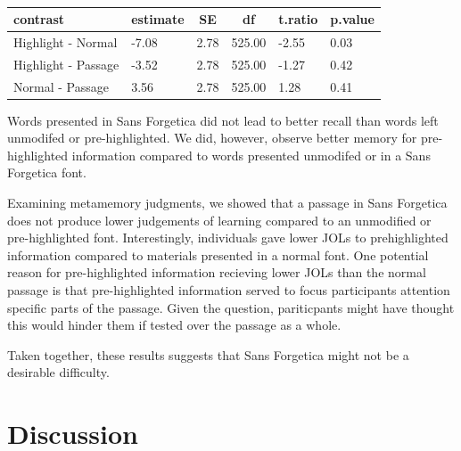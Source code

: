 \documentclass[english,doc]{apa6}
\begin{document}
\begin{table}[tbp]

\begin{center}
\begin{threeparttable}

\caption{\label{tab:unnamed-chunk-4}}

\begin{tabular}{llllll}
\toprule
contrast & \multicolumn{1}{c}{estimate} & \multicolumn{1}{c}{SE} & \multicolumn{1}{c}{df} & \multicolumn{1}{c}{t.ratio} & \multicolumn{1}{c}{p.value}\\
\midrule
Highlight - Normal & -7.08 & 2.78 & 525.00 & -2.55 & 0.03\\
Highlight - Passage & -3.52 & 2.78 & 525.00 & -1.27 & 0.42\\
Normal - Passage & 3.56 & 2.78 & 525.00 & 1.28 & 0.41\\
\bottomrule
\end{tabular}

\end{threeparttable}
\end{center}

\end{table}

Words presented in Sans Forgetica did not lead to better recall than words left unmodifed or pre-highlighted. We did, however, observe better memory for pre-highlighted information compared to words presented unmodifed or in a Sans Forgetica font.

Examining metamemory judgments, we showed that a passage in Sans Forgetica does not produce lower judgements of learning compared to an unmodified or pre-highlighted font. Interestingly, individuals gave lower JOLs to prehighlighted information compared to materials presented in a normal font. One potential reason for pre-highlighted information recieving lower JOLs than the normal passage is that pre-highlighted information served to focus participants attention specific parts of the passage. Given the question, pariticpants might have thought this would hinder them if tested over the passage as a whole.

Taken together, these results suggests that Sans Forgetica might not be a desirable difficulty.

\hypertarget{discussion}{%
\section{Discussion}\label{discussion}}
\end{document}
